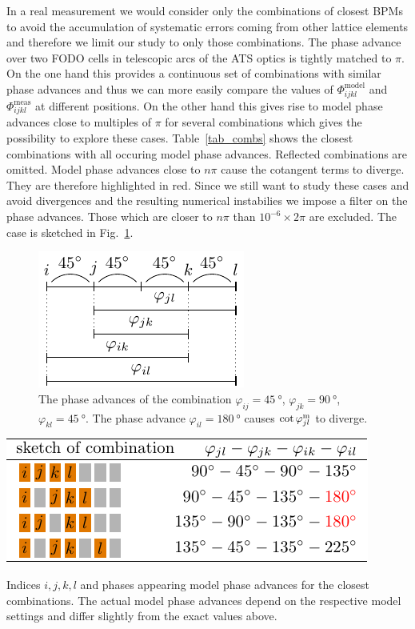In a real measurement we would consider only the combinations of closest BPMs to avoid the
accumulation of systematic errors coming from other lattice elements and therefore we limit our study
to only those combinations.
The phase advance over two FODO cells in telescopic arcs of the ATS optics is tightly matched
to $\pi$. On the one hand this provides a continuous set of combinations with
similar phase advances and thus we can more easily compare the values of $\Phi_{ijkl}^\text{model}$
and $\Phi_{ijkl}^\text{meas}$ at different positions.
On the other hand this gives rise to model phase advances close to multiples of $\pi$ for several
combinations which gives the possibility to explore these cases.
Table~\ref{tab_combs} shows the closest combinations with all occuring model phase advances.
Reflected combinations are omitted. Model phase advances close to $n\pi $ cause the cotangent
terms to diverge. They are therefore highlighted in red.
Since we still want to study these cases and avoid divergences and the resulting numerical instabilies
we impose a filter on the phase advances. 
Those which are closer to $n\pi$ than $10^{-6}\times 2\pi$ are excluded. 
The case  is sketched in Fig.~\ref{fig_thetacomb_ij-kl}.
%
\begin{figure}
  \centering
  \includegraphics[width=.3\linewidth]{figThetacombijkl}
  \caption{The phase advances of the combination
    $\varphi_{ij}=\SI{45}{\degree}$, $\varphi_{jk}=\SI{90}{\degree}$, $ \varphi_{kl}=\SI{45}{\degree}$.
The phase advance $\varphi_{il} = \SI{180}{\degree}$ causes $\cot\varphi_{jl}^\text{m}$ to diverge.
  }
  \label{fig_thetacomb_ij-kl}
\end{figure}
%

\begin{table}[htbp]
    \begin{center}
    \includegraphics{figTable1}
    \end{center}
    \caption{Indices $i,j,k,l$ and phases appearing model phase advances for the closest combinations.
      The actual model phase advances depend on the respective model settings and differ slightly from
      the exact values above.
    }
    \label{tab_combs}
\end{table}

